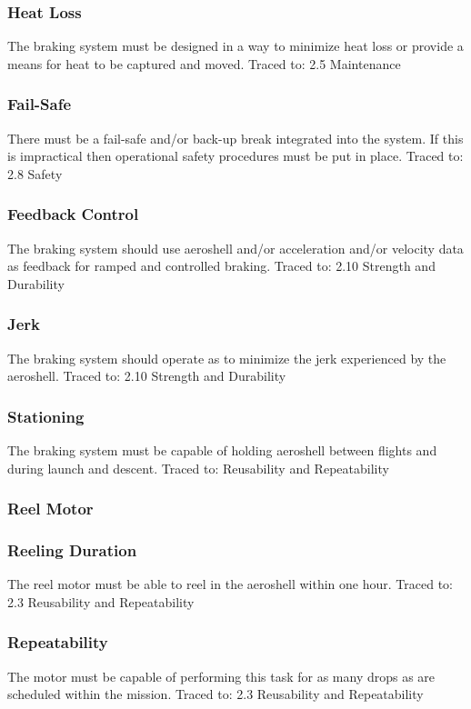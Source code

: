 \subsubsection*{Heat Loss}
\indent\indent The braking system must be designed in a way to minimize heat loss or provide a means for heat to be captured and moved. Traced to: 2.5 Maintenance

\subsubsection*{Fail-Safe}
\indent\indent There must be a fail-safe and/or back-up break integrated into the system. If this is impractical then operational safety procedures must be put in place. Traced to: 2.8 Safety

\subsubsection*{Feedback Control}
\indent\indent The braking system should use aeroshell and/or acceleration and/or velocity data as feedback for ramped and controlled braking. Traced to: 2.10 Strength and Durability

\subsubsection*{Jerk}
\indent\indent The braking system should operate as to minimize the jerk experienced by the aeroshell. Traced to: 2.10 Strength and Durability

\subsubsection*{Stationing}
\indent\indent The braking system must be capable of holding aeroshell between flights and during launch and descent. Traced to: Reusability and Repeatability

\subsubsection{Reel Motor}

\subsubsection*{Reeling Duration}
\indent\indent The reel motor must be able to reel in the aeroshell within one hour. Traced to: 2.3 Reusability and Repeatability

\subsubsection*{Repeatability}
\indent\indent The motor must be capable of performing this task for as many drops as are scheduled within the mission. Traced to: 2.3 Reusability and Repeatability 


